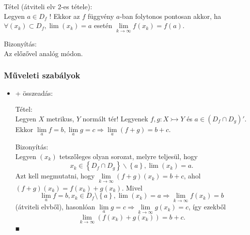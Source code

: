 \documentclass[12pt,a4paper]{scrartcl}
\providecommand{\tightlist}{%
  \setlength{\itemsep}{0pt}\setlength{\parskip}{0pt}}
\newenvironment{tetel}{}{}
\newenvironment{bizonyitas}{}{}
\begin{document}
\begin{tetel}

Tétel (átviteli elv 2-es tétele):\\
Legyen \(a \in D_{f}\) ! Ekkor az \(f\) függvény \(a\)-ban folytonos
pontosan akkor, ha
\(\forall\left( x_{k} \right) \subset D_{f},\lim\left( x_{k} \right) = a\)
esetén
\(\underset{k\rightarrow\infty}{\lim}f\left( x_{k} \right) = f\left( a \right)\).

\end{tetel}

\begin{bizonyitas}

Bizonyítás:\\
Az előzővel analóg módon.

\end{bizonyitas}

\hypertarget{mux171veleti-szabuxe1lyok}{%
\subsubsection{Műveleti szabályok}\label{mux171veleti-szabuxe1lyok}}

\begin{itemize}
\tightlist
\item
  + összeadás:

  \begin{tetel}

  Tétel:\\
  Legyen \(X\) metrikus, \(Y\) normált tér! Legyenek
  \(\left. f,g:X\rightarrowtail Y \right.\) és
  \(a \in \left( {D_{f} \cap D_{g}} \right)'\). Ekkor
  \(\left. \underset{a}{\lim}f = b,\underset{a}{\lim}g = c\Rightarrow\underset{a}{\lim}\left( {f + g} \right) = b + c \right.\).

  \end{tetel}

  \begin{bizonyitas}

  Bizonyítás:\\
  Legyen \(\left( x_{k} \right)\) tetszőleges olyan sorozat, melyre
  teljesül, hogy
  \[x_{k} \in \left\{ {D_{f} \cap D_{g}} \right\}\backslash\left\{ a \right\},\lim\left( x_{k} \right) = a.\]
  Azt kell megmutatni, hogy
  \(\underset{k\rightarrow\infty}{\lim}\left( {f + g} \right)\left( x_{k} \right) = b + c\),
  ahol
  \(\left( {f + g} \right)\left( x_{k} \right) = f\left( x_{k} \right) + g\left( x_{k} \right)\).
  Mivel
  \[\left. \underset{a}{\lim}f = b,x_{k} \in D_{f}\text{\textbackslash}\left\{ a \right\},\lim\left( x_{k} \right) = a\Rightarrow\underset{k\rightarrow\infty}{\lim}f\left( x_{k} \right) = b \right.\]
  (átviteli elvből), hasonlóan
  \(\left. \underset{a}{\lim}g = c\Rightarrow\underset{k\rightarrow\infty}{\lim}g\left( x_{k} \right) = c \right.\),
  így ezekből
  \[{\underset{k\rightarrow\infty}{\lim}\left( {f\left( x_{k} \right) + g\left( x_{k} \right)} \right) = b + c}.\]
  ■

  \end{bizonyitas}
\end{itemize}
\end{document}
